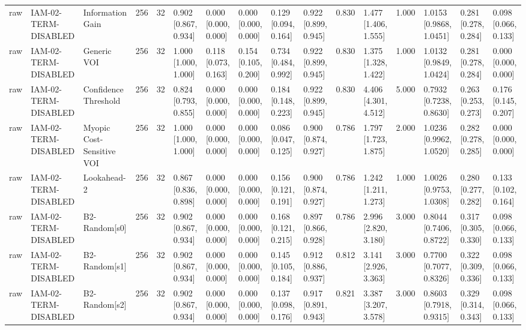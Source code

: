 \begin{table}[!ht]
{\begin{tabular}{llllllllllllllll}
raw & IAM-02-TERM-DISABLED & Information Gain & 256 & 32 & 0.902 [0.867, 0.934] & 0.000 [0.000, 0.000] & 0.000 [0.000, 0.000] & 0.129 [0.094, 0.164] & 0.922 [0.899, 0.945] & 0.830 & 1.477 [1.406, 1.555] & 1.000 & 1.0153 [0.9868, 1.0451] & 0.281 [0.278, 0.284] & 0.098 [0.066, 0.133] \\
raw & IAM-02-TERM-DISABLED & Generic VOI & 256 & 32 & 1.000 [1.000, 1.000] & 0.118 [0.073, 0.163] & 0.154 [0.105, 0.200] & 0.734 [0.484, 0.992] & 0.922 [0.899, 0.945] & 0.830 & 1.375 [1.328, 1.422] & 1.000 & 1.0132 [0.9849, 1.0424] & 0.281 [0.278, 0.284] & 0.000 [0.000, 0.000] \\
raw & IAM-02-TERM-DISABLED & Confidence Threshold & 256 & 32 & 0.824 [0.793, 0.855] & 0.000 [0.000, 0.000] & 0.000 [0.000, 0.000] & 0.184 [0.148, 0.223] & 0.922 [0.899, 0.945] & 0.830 & 4.406 [4.301, 4.512] & 5.000 & 0.7932 [0.7238, 0.8630] & 0.263 [0.253, 0.273] & 0.176 [0.145, 0.207] \\
raw & IAM-02-TERM-DISABLED & Myopic Cost-Sensitive VOI & 256 & 32 & 1.000 [1.000, 1.000] & 0.000 [0.000, 0.000] & 0.000 [0.000, 0.000] & 0.086 [0.047, 0.125] & 0.900 [0.874, 0.927] & 0.786 & 1.797 [1.723, 1.875] & 2.000 & 1.0236 [0.9962, 1.0520] & 0.282 [0.278, 0.285] & 0.000 [0.000, 0.000] \\
raw & IAM-02-TERM-DISABLED & Lookahead-2 & 256 & 32 & 0.867 [0.836, 0.898] & 0.000 [0.000, 0.000] & 0.000 [0.000, 0.000] & 0.156 [0.121, 0.191] & 0.900 [0.874, 0.927] & 0.786 & 1.242 [1.211, 1.273] & 1.000 & 1.0026 [0.9753, 1.0308] & 0.280 [0.277, 0.282] & 0.133 [0.102, 0.164] \\
raw & IAM-02-TERM-DISABLED & B2-Random[s0] & 256 & 32 & 0.902 [0.867, 0.934] & 0.000 [0.000, 0.000] & 0.000 [0.000, 0.000] & 0.168 [0.121, 0.215] & 0.897 [0.866, 0.928] & 0.786 & 2.996 [2.820, 3.180] & 3.000 & 0.8044 [0.7406, 0.8722] & 0.317 [0.305, 0.330] & 0.098 [0.066, 0.133] \\
raw & IAM-02-TERM-DISABLED & B2-Random[s1] & 256 & 32 & 0.902 [0.867, 0.934] & 0.000 [0.000, 0.000] & 0.000 [0.000, 0.000] & 0.145 [0.105, 0.184] & 0.912 [0.886, 0.937] & 0.812 & 3.141 [2.926, 3.363] & 3.000 & 0.7700 [0.7077, 0.8326] & 0.322 [0.309, 0.336] & 0.098 [0.066, 0.133] \\
raw & IAM-02-TERM-DISABLED & B2-Random[s2] & 256 & 32 & 0.902 [0.867, 0.934] & 0.000 [0.000, 0.000] & 0.000 [0.000, 0.000] & 0.137 [0.098, 0.176] & 0.917 [0.891, 0.943] & 0.821 & 3.387 [3.207, 3.578] & 3.000 & 0.8603 [0.7918, 0.9315] & 0.329 [0.314, 0.343] & 0.098 [0.066, 0.133] \\

\end{tabular}}
\end{table}
